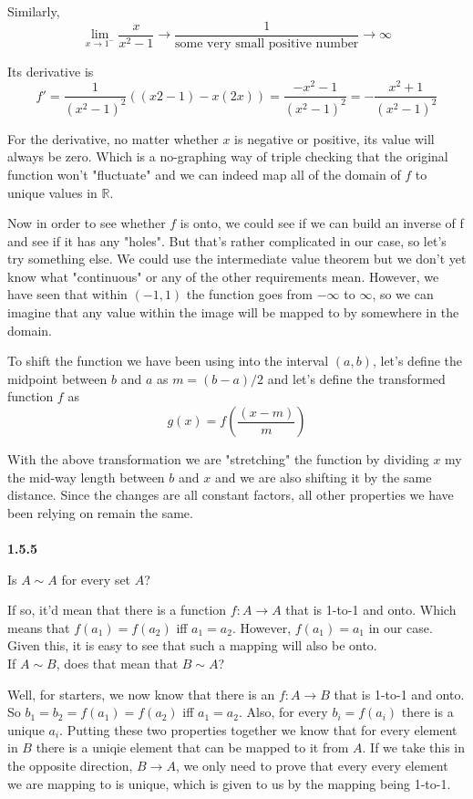 Similarly,
$$
\lim_{x \rightarrow 1^- } \frac{x}{x^2 - 1} \rightarrow
    \frac{1}{\text{some very small positive number}} 
    \rightarrow \infty
$$

Its derivative is
$$
f' = \frac{1}{(x^2 - 1)^2} ( (x2 - 1) - x(2x) ) =
    \frac{-x^2 - 1}{(x^2 - 1)^2} =
    - \frac{x^2 + 1}{(x^2 - 1)^2}
$$

For the derivative, no matter whether $x$ is negative or positive, its value will always be zero.
Which is a no-graphing way of triple checking that the original function won't "fluctuate" and we can indeed map all of
the domain of $f$ to unique values in $\mathbb{R}$.

Now in order to see whether $f$ is onto, we could see if we can build an inverse of f and see if it has any "holes".
But that's rather complicated in our case, so let's try something else.
We could use the intermediate value theorem but we don't yet know what "continuous" or any of the other requirements mean.
However, we have seen that within $(-1,1)$ the function goes from $-\infty$ to $\infty$, so we can imagine that any value
within the image will be mapped to by somewhere in the domain.

To shift the function we have been using into the interval $(a,b)$, let's define the midpoint between $b$ and $a$ as
$m = (b-a)/2$ and let's define the transformed function $f$ as
$$
g(x) = f\left(\frac{(x - m)}{m} \right)
$$

With the above transformation we are "stretching" the function by dividing $x$ my the mid-way length between $b$ and $x$
and we are also shifting it by the same distance.
Since the changes are all constant factors, all other properties we have been relying on remain the same.
\\~\\



\textbf{1.5.5}

Is $A \sim A$ for every set $A$?

If so, it'd mean that there is a function $f: A \rightarrow A$ that is 1-to-1 and onto.
Which means that $f(a_1) = f(a_2)$ iff $a_1 = a_2$.
However, $f(a_1) = a_1$ in our case.
Given this, it is easy to see that such a mapping will also be onto.
\\

If $A\sim B$, does that mean that $B\sim A$?

Well, for starters, we now know that there is an $f: A\rightarrow B$ that is 1-to-1 and onto.
So $b_1 = b_2 = f(a_1) = f(a_2)$ iff $a_1 = a_2$.
Also, for every $b_i = f(a_i)$ there is a unique $a_i$.
Putting these two properties together we know that for every element in $B$ there is a uniqie element
that can be mapped to it from $A$.
If we take this in the opposite direction, $B\rightarrow A$, we only need to prove that every every element we are mapping to
is unique, which is given to us by the mapping being 1-to-1.
\\

